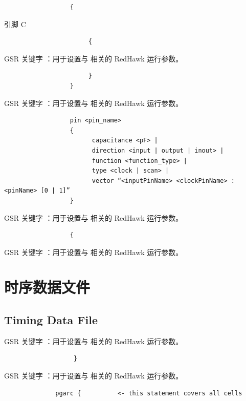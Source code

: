 \begin{lstlisting}
                  {
\end{lstlisting}

引脚 C

\begin{lstlisting}
                       {
\end{lstlisting}

GSR 关键字 ：用于设置与  相关的 RedHawk 运行参数。

\begin{lstlisting}
                       }
                  }
\end{lstlisting}

GSR 关键字 ：用于设置与  相关的 RedHawk 运行参数。

\begin{lstlisting}
                  pin <pin_name>
                  {
                        capacitance <pF> |
                        direction <input | output | inout> |
                        function <function_type> |
                        type <clock | scan> |
                        vector “<inputPinName> <clockPinName> : <pinName> [0 | 1]”
                  }
\end{lstlisting}

GSR 关键字 ：用于设置与  相关的 RedHawk 运行参数。

\begin{lstlisting}
                  {
\end{lstlisting}

GSR 关键字 ：用于设置与  相关的 RedHawk 运行参数。

\section{时序数据文件}
\subsection*{Timing Data File}

GSR 关键字 ：用于设置与  相关的 RedHawk 运行参数。

\begin{lstlisting}
                   }
\end{lstlisting}

GSR 关键字 ：用于设置与  相关的 RedHawk 运行参数。

\begin{lstlisting}
              pgarc {          <- this statement covers all cells
\end{lstlisting}

